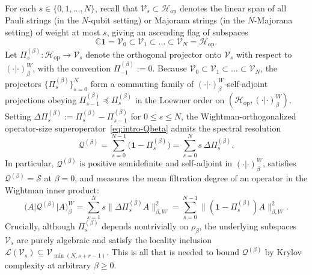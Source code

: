 \documentclass[11pt,a4paper]{article}
\numberwithin{equation}{section}
\theoremstyle{plain}
\theoremstyle{definition}
\newcommand{\Hop}{\mathcal{H}_{\mathrm{op}}}
\begin{document}
For each $s\in\{0,1,\dots,N\}$, recall that $\mathcal{V}_s \subset \Hop$ denotes the linear span of all Pauli strings (in the $N$-qubit setting) or Majorana strings (in the $N$-Majorana setting) of weight at most $s$, giving an ascending flag of subspaces
\[
  \mathbb{C}\mathbf{1} = \mathcal{V}_0 \subset \mathcal{V}_1 \subset \dots \subset \mathcal{V}_N = \Hop.
\]
Let $\Pi_s^{(\beta)}:\Hop\to\mathcal{V}_s$ denote the orthogonal projector onto $\mathcal{V}_s$ with respect to $(\cdot|\cdot)_\beta^W$, with the convention $\Pi_{-1}^{(\beta)} := 0$. Because $\mathcal{V}_0 \subset \mathcal{V}_1 \subset \dots \subset \mathcal{V}_N$, the projectors $\{\Pi_s^{(\beta)}\}_{s=0}^N$ form a commuting family of $(\cdot|\cdot)_\beta^W$-self-adjoint projections obeying $\Pi_{s-1}^{(\beta)} \preceq \Pi_s^{(\beta)}$ in the Loewner order on $(\Hop,(\cdot|\cdot)_\beta^W)$. Setting $\Delta\Pi_s^{(\beta)} := \Pi_s^{(\beta)} - \Pi_{s-1}^{(\beta)}$ for $0\le s\le N$, the Wightman-orthogonalized operator-size superoperator~\eqref{eq:intro-Qbeta} admits the spectral resolution
\begin{equation}\label{eq:Qbeta-spectral}
  \mathcal{Q}^{(\beta)} = \sum_{s=0}^{N-1}\bigl(\mathbf{1}-\Pi_s^{(\beta)}\bigr)
  = \sum_{s=0}^N s\,\Delta\Pi_s^{(\beta)}.
\end{equation}
In particular, $\mathcal{Q}^{(\beta)}$ is positive semidefinite and self-adjoint in $(\cdot|\cdot)_\beta^W$, satisfies $\mathcal{Q}^{(\beta)} = \mathcal{S}$ at $\beta = 0$, and measures the mean filtration degree of an operator in the Wightman inner product:
\[
  \bigl(A\big|\mathcal{Q}^{(\beta)}\big|A\bigr)_\beta^W
  = \sum_{s=1}^N s\bigl\|\Delta\Pi_s^{(\beta)}A\bigr\|_{\beta,W}^2
  = \sum_{s=0}^{N-1}\bigl\|(\mathbf{1}-\Pi_s^{(\beta)})A\bigr\|_{\beta,W}^2.
\]
Crucially, although $\Pi_s^{(\beta)}$ depends nontrivially on $\rho_\beta$, the underlying subspaces $\mathcal{V}_s$ are purely algebraic and satisfy the locality inclusion $\mathcal{L}(\mathcal{V}_s)\subseteq\mathcal{V}_{\min(N,s+r-1)}$. This is all that is needed to bound $\mathcal{Q}^{(\beta)}$ by Krylov complexity at arbitrary $\beta\ge 0$.
\end{document}

